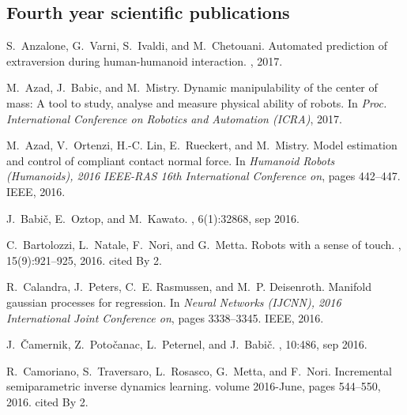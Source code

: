 \documentclass[12pt,a4paper,twoside]{article}
\begin{document}
\subsection{Fourth year scientific publications}
\makeatletter
\renewcommand\@biblabel[1]{}
\makeatother

\renewcommand{\section}[2]{}%
\begin{thebibliography}{}
S.~Anzalone, G.~Varni, S.~Ivaldi, and M.~Chetouani.
\newblock Automated prediction of extraversion during human-humanoid
  interaction.
, 2017.

M.~Azad, J.~Babic, and M.~Mistry.
\newblock Dynamic manipulability of the center of mass: A tool to study,
  analyse and measure physical ability of robots.
\newblock In {\em Proc. International Conference on Robotics and Automation
  (ICRA)}, 2017.

M.~Azad, V.~Ortenzi, H.-C. Lin, E.~Rueckert, and M.~Mistry.
\newblock Model estimation and control of compliant contact normal force.
\newblock In {\em Humanoid Robots (Humanoids), 2016 IEEE-RAS 16th International
  Conference on}, pages 442--447. IEEE, 2016.

J.~Babi{\v{c}}, E.~Oztop, and M.~Kawato.
, 6(1):32868, sep 2016.

C.~Bartolozzi, L.~Natale, F.~Nori, and G.~Metta.
\newblock Robots with a sense of touch.
, 15(9):921--925, 2016.
\newblock cited By 2.

R.~Calandra, J.~Peters, C.~E. Rasmussen, and M.~P. Deisenroth.
\newblock Manifold gaussian processes for regression.
\newblock In {\em Neural Networks (IJCNN), 2016 International Joint Conference
  on}, pages 3338--3345. IEEE, 2016.

J.~{\v{C}}amernik, Z.~Poto{\v{c}}anac, L.~Peternel, and J.~Babi{\v{c}}.
, 10:486, sep 2016.

R.~Camoriano, S.~Traversaro, L.~Rosasco, G.~Metta, and F.~Nori.
\newblock Incremental semiparametric inverse dynamics learning.
\newblock volume 2016-June, pages 544--550, 2016.
\newblock cited By 2.


\end{thebibliography}
\end{document}
